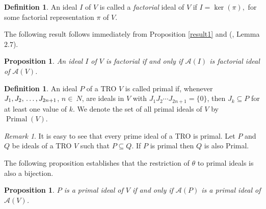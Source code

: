 \documentclass{birkjour}
\newtheorem{prop}[thm]{Proposition}
\theoremstyle{definition}
\newtheorem{defn}[thm]{Definition}
\theoremstyle{remark}
\newtheorem{rem}[thm]{Remark}
\numberwithin{equation}{section}
\begin{document}
\begin{defn}
    An ideal $I$ of $V$ is called a \emph{factorial} ideal of $V$ if $I= \operatorname{ker}(\pi),$ for some  factorial representation $\pi$ of $V$.
\end{defn}

The following result follows immediately from Proposition \ref{result1} and (\cite{AAV}, Lemma $2.7$). 

\begin{prop} \label{facmain}
    An ideal $I$ of $V$ is factorial if and only if $\mathcal{A}(I)$ is factorial ideal of $\mathcal{A}(V)$.
\end{prop}








\begin{defn}
  
 An ideal $P$ of a TRO $V$ is called primal if, whenever $J_1, J_2,  \newline \dots, J_{2n+1}$, $n\in \ N$, are ideals in $V$ with $J_1J_2 \dotsm  J_{2n+1} = \{0\}$, then $J_k \subseteq P$ for at least one value of $k$. We  denote the set of all primal ideals of $V$ by $\operatorname{Primal}(V)$.
  
\end{defn}

\begin{rem}
    It is easy to see that every  prime ideal of a TRO is primal. Let $P$ and $Q$ be ideals of a TRO $V$ such that $P \subseteq Q$. If  $P$ is primal then $Q$ is also Primal.
\end{rem}
    







 The following proposition establishes that the restriction of $\theta$ to primal ideals is also a bijection.



\begin{prop} \label{primalmain}
    $P$ is a primal ideal of $V$ if and only if $\mathcal{A}(P)$ is a primal ideal of $\mathcal{A}(V)$.
\end{prop}
\end{document}
